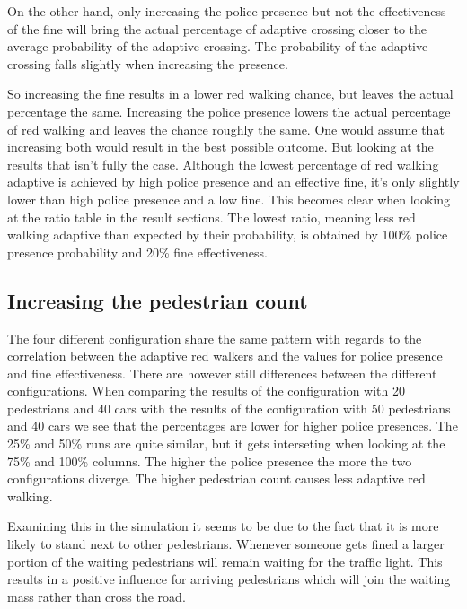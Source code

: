 \documentclass[a4paper]{article}
\begin{document}
On the other hand, only increasing the police presence but not the effectiveness of the fine will bring the actual percentage of adaptive crossing closer to the average probability of the adaptive crossing. The probability of the adaptive crossing falls slightly when increasing the presence.

So increasing the fine results in a lower red walking chance, but leaves the actual percentage the same. Increasing the police presence lowers the actual percentage of red walking and leaves the chance roughly the same. One would assume that increasing both would result in the best possible outcome. But looking at the results that isn't fully the case. Although the lowest percentage of red walking adaptive is achieved by high police presence and an effective fine, it's only slightly lower than high police presence and a low fine. This becomes clear when looking at the ratio table in the result sections. The lowest ratio, meaning less red walking adaptive than expected by their probability, is obtained by 100\% police presence probability and 20\% fine effectiveness.

\subsection{Increasing the pedestrian count}
The four different configuration share the same pattern with regards to the correlation between the adaptive red walkers and the values for police presence and fine effectiveness. There are however still differences between the different configurations. When comparing the results of the configuration with 20 pedestrians and 40 cars with the results of the configuration with 50 pedestrians and 40 cars we see that the percentages are lower for higher police presences. The 25\% and 50\% runs are quite similar, but it gets interseting when looking at the 75\% and 100\% columns. The higher the police presence the more the two configurations diverge. The higher pedestrian count causes less adaptive red walking.

Examining this in the simulation it seems to be due to the fact that it is more likely to stand next to other pedestrians. Whenever someone gets fined a larger portion of the waiting pedestrians will remain waiting for the traffic light. This results in a positive influence for arriving pedestrians which will join the waiting mass rather than cross the road.
\end{document}
